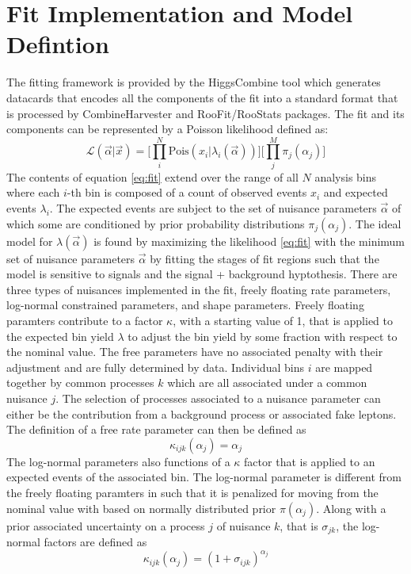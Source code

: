 


\section{Fit Implementation and Model Defintion}
The fitting framework is provided by the HiggsCombine tool which generates datacards that encodes all the components of the fit into a standard format that is processed by CombineHarvester and RooFit/RooStats packages. The fit and its components can be represented by a Poisson likelihood defined as:
\begin{equation}
\label{eq:fit}
\mathcal{L}(\vec{\alpha}|\vec{x}) = \bigg[ \prod_i^N \text{Pois}(x_i|\lambda_i(\vec{\alpha})) \bigg] \bigg[\prod_j^M \pi_j(\alpha_j) \bigg]
\end{equation}
The contents of equation \ref{eq:fit} extend over the range of all $N$ analysis bins where each $i$-th bin is composed of a count of observed events $x_i$ and expected events $\lambda_i$. The expected events are subject to the set of nuisance parameters $\vec{\alpha}$ of which some are conditioned by prior probability distributions $\pi_j(\alpha_j)$. The ideal model for $\lambda(\vec{\alpha})$ is found by maximizing the likelihood \ref{eq:fit} with the minimum set of nuisance parameters $\vec{\alpha}$ by fitting the stages of fit regions such that the model is sensitive to signals and the signal + background hyptothesis.  There are three types of nuisances implemented in the fit, freely floating rate parameters, log-normal constrained parameters, and shape parameters.  Freely floating paramters contribute to a factor $\kappa$, with a starting value of 1,  that is applied to the expected bin yield $\lambda$ to adjust the bin yield by some fraction with respect to the nominal value. The free parameters have no associated penalty with their adjustment and are fully determined by data. Individual bins $i$ are mapped together by common processes $k$ which are all associated under a common nuisance $j$. The selection of processes associated to a nuisance parameter can either be the contribution from a background process or associated fake leptons. The definition of a free rate parameter can then be defined as 
\begin{equation}
\label{eq:rateparam}
\kappa_{ijk}(\alpha_j) = \alpha_j
\end{equation}  
The log-normal parameters also functions of a $\kappa$ factor that is applied to an expected events of the associated bin. The log-normal parameter is different from the freely floating paramters in such that it is penalized for moving from the nominal value with based on normally distributed prior $\pi(\alpha_j)$. Along with a prior associated uncertainty on a process $j$ of nuisance $k$, that is $\sigma_{jk}$, the log-normal factors are defined as
\begin{equation}
\label{eq:logparam}
\kappa_{ijk}(\alpha_j) = (1+\sigma_{ijk})^{\alpha_j}
\end{equation}

